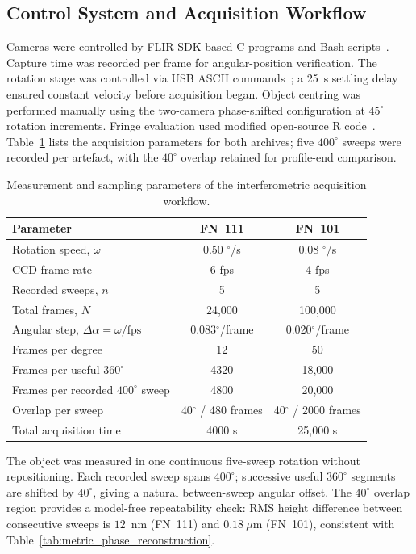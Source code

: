 \documentclass[review]{elsarticle}
\begin{document}
\subsection{Control System and Acquisition Workflow}
Cameras were controlled by FLIR SDK-based C programs and Bash scripts~\cite{FLIR_sdk}. Capture time was recorded per frame for angular-position verification. The rotation stage was controlled via USB ASCII commands~\cite{newport_esp_manual}; a 25~s settling delay ensured constant velocity before acquisition began. Object centring was performed manually using the two-camera phase-shifted configuration at $45^\circ$ rotation increments. Fringe evaluation used modified open-source R code~\cite{Meijer2018a,Ihaka1996}. Table~\ref{tab:meas_param} lists the acquisition parameters for both archives; five $400^\circ$ sweeps were recorded per artefact, with the $40^\circ$ overlap retained for profile-end comparison.

\begin{table}[ht]
\centering
\caption{Measurement and sampling parameters of the interferometric acquisition workflow.}
\label{tab:meas_param}
\begin{tabular}{lcc}
\toprule
Parameter & FN~111 & FN~101 \\
\midrule
Rotation speed, $\omega$ & 0.50 $^\circ$/s & 0.08 $^\circ$/s \\
CCD frame rate & 6 fps & 4 fps \\
Recorded sweeps, $n$ & 5 & 5 \\
Total frames, $N$ & 24,000 & 100,000 \\
Angular step, $\Delta\alpha=\omega/\mathrm{fps}$ & 0.083$^\circ$/frame & 0.020$^\circ$/frame \\
Frames per degree & 12 & 50 \\
Frames per useful $360^\circ$ & 4320 & 18,000 \\
Frames per recorded $400^\circ$ sweep & 4800 & 20,000 \\
Overlap per sweep & 40$^\circ$ / 480 frames & 40$^\circ$ / 2000 frames \\
Total acquisition time & 4000 s & 25,000 s \\
\bottomrule
\end{tabular}
\end{table}

The object was measured in one continuous five-sweep rotation without repositioning. Each recorded sweep spans $400^\circ$; successive useful $360^\circ$ segments are shifted by $40^\circ$, giving a natural between-sweep angular offset. The $40^\circ$ overlap region provides a model-free repeatability check: RMS height difference between consecutive sweeps is $12$~nm (FN~111) and $0.18~\mu$m (FN~101), consistent with Table~\ref{tab:metric_phase_reconstruction}.
\end{document}
